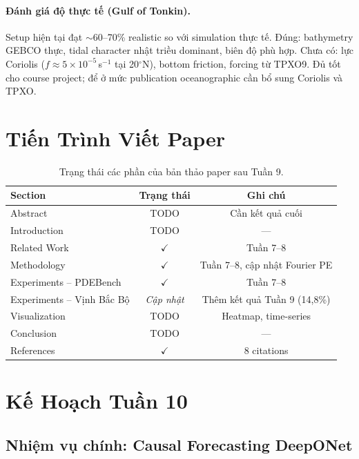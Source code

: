 \documentclass[12pt,a4paper]{article}
\begin{document}
\paragraph{Đánh giá độ thực tế (Gulf of Tonkin).}
Setup hiện tại đạt $\sim$60--70\% realistic so với simulation thực tế. Đúng: bathymetry GEBCO thực, tidal character nhật triều dominant, biên độ phù hợp. Chưa có: lực Coriolis ($f \approx 5 \times 10^{-5}$\,s$^{-1}$ tại 20$^\circ$N), bottom friction, forcing từ TPXO9. Đủ tốt cho course project; để ở mức publication oceanographic cần bổ sung Coriolis và TPXO.

\section{Tiến Trình Viết Paper}

\begin{table}[ht]
  \centering
  \caption{Trạng thái các phần của bản thảo paper sau Tuần 9.}
  \label{tab:paper_status}
  \begin{tabular}{@{}lcc@{}}
    \toprule
    \textbf{Section} & \textbf{Trạng thái} & \textbf{Ghi chú} \\
    \midrule
    Abstract & TODO & Cần kết quả cuối \\
    Introduction & TODO & --- \\
    Related Work & $\checkmark$ & Tuần 7--8 \\
    Methodology & $\checkmark$ & Tuần 7--8, cập nhật Fourier PE \\
    Experiments -- PDEBench & $\checkmark$ & Tuần 7--8 \\
    Experiments -- Vịnh Bắc Bộ & \textit{Cập nhật} & Thêm kết quả Tuần 9 (14,8\%) \\
    Visualization & TODO & Heatmap, time-series \\
    Conclusion & TODO & --- \\
    References & $\checkmark$ & 8 citations \\
    \bottomrule
  \end{tabular}
\end{table}

\section{Kế Hoạch Tuần 10}

\subsection{Nhiệm vụ chính: Causal Forecasting DeepONet}
\end{document}
